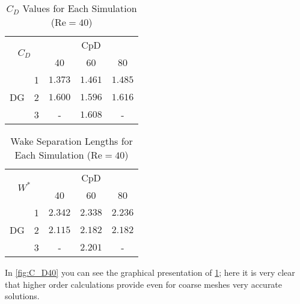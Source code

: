 \begin{table}[htp]
	\centering
	\def\arraystretch{1.5}
		\begin{tabular}{|c|c|c|c|c|}
			\hline
			\multicolumn{2}{|c|}{\multirow{2}{*}{$C_D$}} & \multicolumn{3}{c|}{CpD} \\ \cline{3-5} 
			\multicolumn{2}{|c|}{}                       & 40     & 60    & 80    \\ \hline
			\multirow{3}{*}{DG}            & 1           &   $1.373$     &     $1.461$  &     $1.485$   \\ \cline{2-5} 
			& 2           &     $1.600$   &   $1.596$    &     $1.616$   \\ \cline{2-5} 
			& 3           &      -  &     $1.608$  &     -   \\ \hline
		\end{tabular}
		\caption[$C_D$ Values for each simulation]{$C_D$ Values for Each Simulation ($\text{Re} = 40$)}	
		\label{C_D40}
	\end{table}
	\begin{table}[htp]
	\centering
	\def\arraystretch{1.5}
		\begin{tabular}{|c|c|c|c|c|}
			\hline
			\multicolumn{2}{|c|}{\multirow{2}{*}{$W^*$}} & \multicolumn{3}{c|}{CpD} \\ \cline{3-5} 
			\multicolumn{2}{|c|}{}                       & 40     & 60    & 80    \\ \hline
			\multirow{3}{*}{DG}            & 1           &    $2.342$    &    $2.338$   &    $2.236$    \\ \cline{2-5} 
			& 2           &     $2.115$   &    $2.182$   &     $2.182$   \\ \cline{2-5} 
			& 3           &     -   &    $2.201$   &    -    \\ \hline
		\end{tabular}
		\caption{Wake Separation Lengths for Each Simulation ($\text{Re} = 40$)}	
		\label{W40}
\end{table}
In \cref{fig:C_D40} you can see the graphical presentation of \cref{C_D40}; here it is very clear that higher order calculations provide even for coarse meshes very accurate solutions. \\\indent
